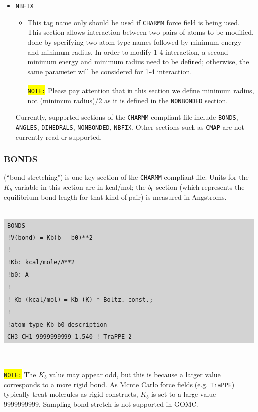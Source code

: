 \begin{itemize}
\item \texttt{NBFIX}
\begin{itemize}
\item This tag name only should be used if \texttt{CHARMM} force field is being used. This section allows interaction between two pairs of atoms to be modified, done by specifying two atom type names followed by minimum energy and minimum radius. In order to modify 1-4 interaction, a second minimum energy and minimum radius need to be defined; otherwise, the same parameter will be considered for 1-4 interaction.\\\\
\colorbox{yellow}{\texttt{NOTE:}} Please pay attention that in this section we define minimum radius, not (minimum radius)/2 as it is defined in the \texttt{NONBONDED} section.
\end{itemize}
Currently, supported sections of the \texttt{CHARMM} compliant file include \texttt{BONDS}, \texttt{ANGLES}, \texttt{DIHEDRALS}, \texttt{NONBONDED}, \texttt{NBFIX}. Other sections such as \texttt{CMAP} are not currently read or supported.\\
\end{itemize}
\subsubsection{BONDS}
(``bond stretching") is one key section of the \texttt{CHARMM}-compliant file. Units for the \texttt{$K_b$} variable in this section are in kcal/mol; the \texttt{$b_0$} section (which represents the equilibrium bond length for that kind of pair) is measured in Angstroms.\\\\
\colorbox{lightgray}{
\begin{tabular}{l}
\texttt{BONDS}\\
\texttt{!V(bond) = Kb(b - b0)**2}\\
\texttt{!}\\
\texttt{!Kb: kcal/mole/A**2}\\
\texttt{!b0: A}\\
\texttt{!}\\
\texttt{! Kb (kcal/mol) = Kb (K) * Boltz. const.; }\\
\texttt{!}\\
\texttt{!atom type     Kb              b0        description}\\
\texttt{CH3 CH1        9999999999      1.540   ! TraPPE 2}\\
\end{tabular}}\\\\
\colorbox{yellow}{\texttt{NOTE:}} The \texttt{$K_b$} value may appear odd, but this is because a larger value corresponds to a more rigid bond. As Monte Carlo force fields (e.g. \texttt{TraPPE}) typically treat molecules as rigid constructs, \texttt{$K_b$} is set to a large value - 9999999999. Sampling bond stretch is not supported in GOMC.\\\\
